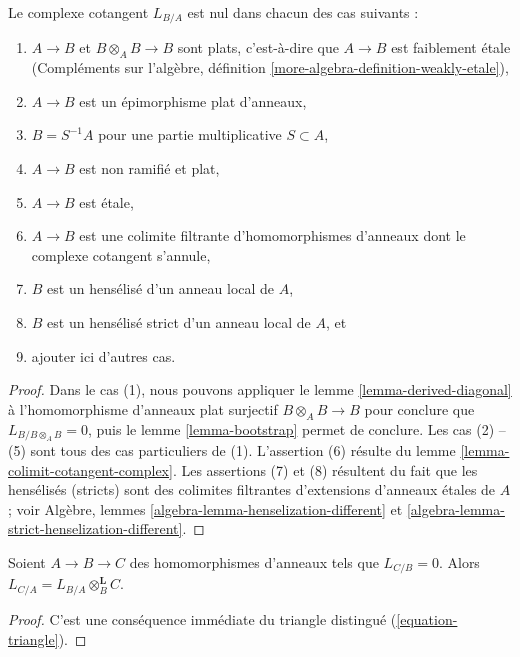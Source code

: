 \begin{lemma}
\label{lemma-when-zero}
Le complexe cotangent $L_{B/A}$ est nul dans chacun des cas suivants :
\begin{enumerate}
\item $A \to B$ et $B \otimes_A B \to B$ sont plats, c'est-à-dire que
$A \to B$ est faiblement \'etale (Compléments sur l'algèbre, définition
\ref{more-algebra-definition-weakly-etale}),
\item $A \to B$ est un épimorphisme plat d'anneaux,
\item $B = S^{-1}A$ pour une partie multiplicative $S \subset A$,
\item $A \to B$ est non ramifié et plat,
\item $A \to B$ est \'etale,
\item $A \to B$ est une colimite filtrante d'homomorphismes d'anneaux dont le
complexe cotangent s'annule,
\item $B$ est un hensélisé d'un anneau local de $A$,
\item $B$ est un hensélisé strict d'un anneau local de $A$, et
\item ajouter ici d'autres cas.
\end{enumerate}
\end{lemma}

\begin{proof}
Dans le cas (1), nous pouvons appliquer le lemme
\ref{lemma-derived-diagonal} à l'homomorphisme d'anneaux plat surjectif
$B \otimes_A B \to B$ pour conclure que $L_{B/B \otimes_A B} = 0$, puis le
lemme \ref{lemma-bootstrap} permet de conclure. Les cas (2) -- (5) sont tous
des cas particuliers de (1). L'assertion (6) résulte du lemme
\ref{lemma-colimit-cotangent-complex}. Les assertions (7) et (8) résultent du
fait que les hensélisés (stricts) sont des colimites filtrantes d'extensions
d'anneaux \'etales de $A$ ; voir Algèbre, lemmes
\ref{algebra-lemma-henselization-different} et
\ref{algebra-lemma-strict-henselization-different}.
\end{proof}

\begin{lemma}
\label{lemma-localize-on-top}
Soient $A \to B \to C$ des homomorphismes d'anneaux tels que $L_{C/B} = 0$.
Alors $L_{C/A} = L_{B/A} \otimes_B^\mathbf{L} C$.
\end{lemma}

\begin{proof}
C'est une conséquence immédiate du triangle distingué
(\ref{equation-triangle}).
\end{proof}

